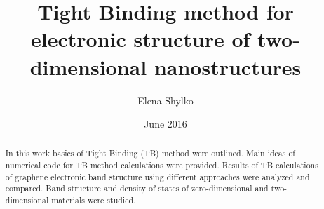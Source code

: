 \documentclass{my_pracamgr}
\author{Elena Shylko}
\title{Tight Binding method for electronic structure of two-dimensional nanostructures}
\date{June 2016}
\begin{document}
\maketitle

\begin{abstract}
In this work basics of Tight Binding (TB) method were outlined. Main ideas of numerical code for TB method calculations were provided. Results of TB calculations of graphene electronic band structure using different approaches were analyzed and compared. Band structure and density of states of zero-dimensional and two-dimensional materials were studied.
\end{abstract}

\tableofcontents












\end{document}
